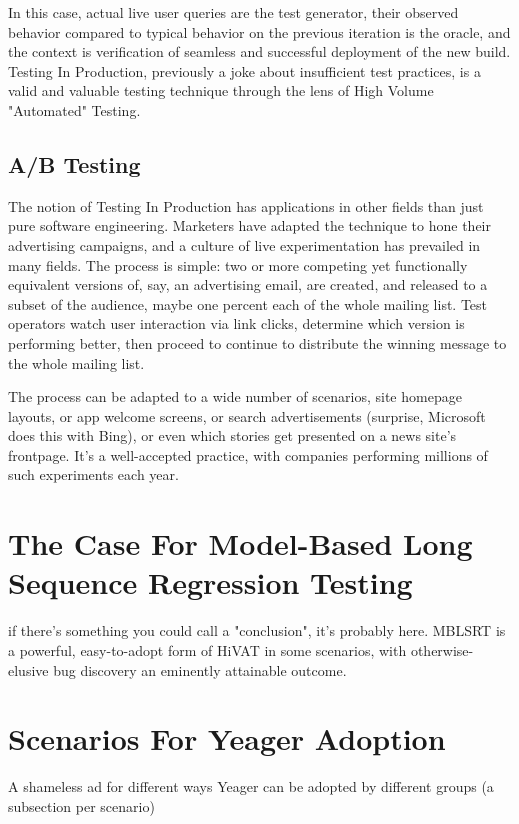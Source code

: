 In this case, actual live user queries are the test generator, their observed behavior compared to typical behavior on the previous iteration is the oracle, and the context is verification of seamless and successful deployment of the new build. Testing In Production, previously a joke about insufficient test practices, is a valid and valuable testing technique through the lens of High Volume "Automated" Testing.

\subsection{A/B Testing}
The notion of Testing In Production has applications in other fields than just pure software engineering. Marketers have adapted the technique to hone their advertising campaigns, and a culture of live experimentation has prevailed in many fields. The process is simple: two or more competing yet functionally equivalent versions of, say, an advertising email, are created, and released to a subset of the audience, maybe one percent each of the whole mailing list. Test operators watch user interaction via link clicks, determine which version is performing better, then proceed to continue to distribute the winning message to the whole mailing list.

The process can be adapted to a wide number of scenarios, site homepage layouts, or app welcome screens, or search advertisements (surprise, Microsoft does this with Bing), or even which stories get presented on a news site's frontpage. It's a well-accepted practice, with companies performing millions of such experiments each year. \citep{HBR2017ABTest}

\section{The Case For Model-Based Long Sequence Regression Testing}
  if there's something you could call a "conclusion", it's probably here. MBLSRT is a powerful, easy-to-adopt form of HiVAT in some scenarios, with otherwise-elusive bug discovery an eminently attainable outcome. %

\section{Scenarios For Yeager Adoption}
A shameless ad for different ways Yeager can be adopted by different groups (a subsection per scenario) %
